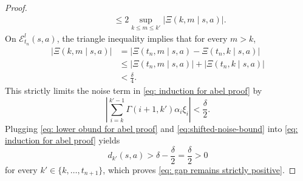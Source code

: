 \begin{proof}
\begin{align}
\nonumber
&\qquad\le
2 \sup_{k \le m \le k'} \bigl| \Xi(k,m\mid s,a) \bigr| .
\end{align}
On $\mathcal E^l_{t_n}(s,a)$, the triangle inequality implies that for every $m > k$,
\begin{align*}
\bigl|\Xi(k,m\mid s,a)\bigr|
&=
\bigl|
\Xi(t_n , m \mid s,a) - \Xi(t_n, k \mid s,a)
\bigr|
\\
&\le
\bigl|\Xi(t_n,m\mid s,a)\bigr|
+
\bigl|\Xi(t_n,k\mid s,a)\bigr|
\\
&<
\frac{\delta}{4}.
\end{align*}
This strictly limits the noise term in \eqref{eq: induction for abel proof} by
\begin{equation}
\label{eq:shifted-noise-bound}
\left|
\sum_{i=k}^{k'-1} \Gamma(i+1,k') \alpha_i \xi_{i}
\right|
< \frac{\delta}{2}.
\end{equation}
Plugging \eqref{eq: lower obund for abel proof} and \eqref{eq:shifted-noise-bound} into \eqref{eq: induction for abel proof}  
yields
\[
d_{k'}(s,a)
>
\delta - \frac{\delta}{2}
= \frac{\delta}{2}
>
0
\]
for every $k' \in \{k,\dots,t_{n+1}\}$, which proves \eqref{eq: gap remains strictly positive}.



\end{proof}
